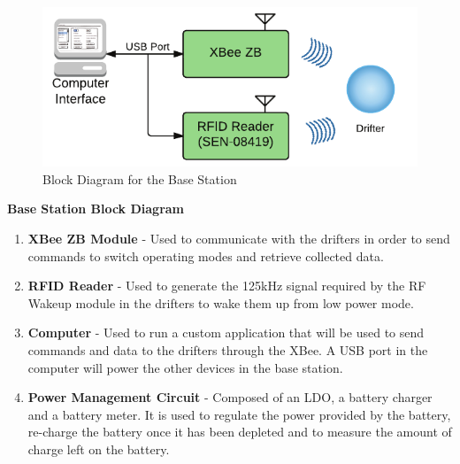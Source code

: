\begin{figure}[ht]
	\centering
	\includegraphics[scale=1]{img/baseBlockDiagram}
	\caption{Block Diagram for the Base Station \label{fig:baseBlockDiagram}}
\end{figure}
\noindent\textbf{Base Station Block Diagram}
\begin{enumerate}
\item \textbf{XBee ZB Module} -  Used to communicate with the drifters in order to send commands to switch operating modes and retrieve collected data.

\item \textbf{RFID Reader} - Used to generate the 125kHz signal required by the RF Wakeup module in the drifters to wake them up from low power mode.

\item \textbf{Computer} - Used to run a custom application that will be used to send commands and data to the drifters through the XBee.  A USB port in the computer will power the other devices in the base station.

\item \textbf{Power Management Circuit} - Composed of an LDO, a battery charger and a battery meter.  It is used to regulate the power provided by the battery, re-charge the battery once it has been depleted and to measure the amount of charge left on the battery.


\end{enumerate}
